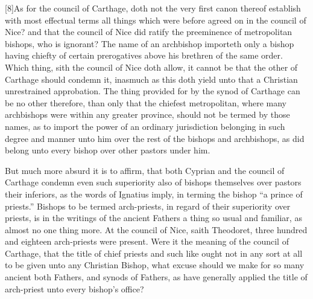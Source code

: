 [8]As for the council of Carthage, doth not the very first canon thereof establish with most effectual terms all things which were before agreed on in the council of Nice? and that the council of Nice did ratify the preeminence of metropolitan bishops, who is ignorant? The name of an archbishop importeth only a bishop having chiefty of certain prerogatives above his brethren of the same order. Which thing, sith the council of Nice doth allow, it cannot be that the other of Carthage should condemn it, inasmuch as this doth yield unto that a Christian unrestrained approbation. The thing provided for by the synod of Carthage can be no other therefore, than only that the chiefest metropolitan, where many archbishops were within any greater province, should not be termed by those names, as to import the power of an ordinary jurisdiction belonging in such degree and manner unto him over the rest of the bishops and archbishops, as did belong unto every bishop over other pastors under him.

But much more absurd it is to affirm, that both Cyprian  and the council of Carthage condemn even such superiority also of bishops themselves over pastors their inferiors, as the words of Ignatius imply, in terming the bishop “a prince of priests.” Bishops to be termed arch-priests, in regard of their superiority over priests, is in the writings of the ancient Fathers a thing so usual and familiar, as almost no one thing more. At the council of Nice, saith Theodoret, three hundred and eighteen arch-priests were present. Were it the meaning of the council of Carthage, that the title of chief priests and such like ought not in any sort at all to be given unto any Christian Bishop, what excuse should we make for so many ancient both Fathers, and synods of Fathers, as have generally applied the title of arch-priest unto every bishop’s office?

